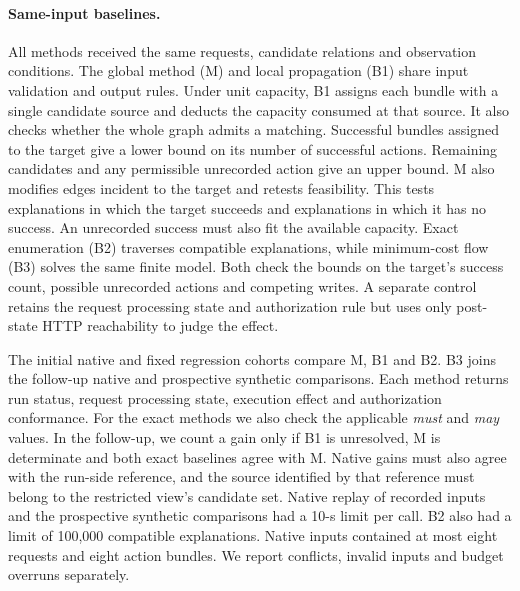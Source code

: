 \paragraph{Same-input baselines.}
All methods received the same requests, candidate relations and observation conditions. The global method (M) and local propagation (B1) share input validation and output rules. Under unit capacity, B1 assigns each bundle with a single candidate source and deducts the capacity consumed at that source. It also checks whether the whole graph admits a matching. Successful bundles assigned to the target give a lower bound on its number of successful actions. Remaining candidates and any permissible unrecorded action give an upper bound. M also modifies edges incident to the target and retests feasibility. This tests explanations in which the target succeeds and explanations in which it has no success. An unrecorded success must also fit the available capacity. Exact enumeration (B2) traverses compatible explanations, while minimum-cost flow (B3) solves the same finite model. Both check the bounds on the target's success count, possible unrecorded actions and competing writes. A separate control retains the request processing state and authorization rule but uses only post-state HTTP reachability to judge the effect.

The initial native and fixed regression cohorts compare M, B1 and B2. B3 joins the follow-up native and prospective synthetic comparisons. Each method returns run status, request processing state, execution effect and authorization conformance. For the exact methods we also check the applicable \emph{must} and \emph{may} values. In the follow-up, we count a gain only if B1 is unresolved, M is determinate and both exact baselines agree with M. Native gains must also agree with the run-side reference, and the source identified by that reference must belong to the restricted view's candidate set. Native replay of recorded inputs and the prospective synthetic comparisons had a 10-s limit per call. B2 also had a limit of 100,000 compatible explanations. Native inputs contained at most eight requests and eight action bundles. We report conflicts, invalid inputs and budget overruns separately.

